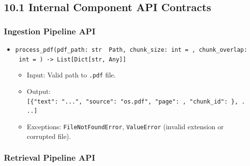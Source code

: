 \documentclass[
]{article}
\providecommand{\tightlist}{%
  \setlength{\itemsep}{0pt}\setlength{\parskip}{0pt}}
\begin{document}
\subsection{10.1 Internal Component API
Contracts}\label{internal-component-api-contracts}

\subsubsection{Ingestion Pipeline API}\label{ingestion-pipeline-api}

\begin{itemize}
\tightlist
\item
  \texttt{process\_\allowbreak pdf(\allowbreak pdf\_\allowbreak path:\ \allowbreak str\ \allowbreak \textbar{}\ \allowbreak Path,\allowbreak \ \allowbreak chunk\_\allowbreak size:\ \allowbreak int\ \allowbreak =\allowbreak \ ,\allowbreak \ \allowbreak chunk\_\allowbreak overlap:\ \allowbreak int\ \allowbreak =\allowbreak \ )\allowbreak \ \allowbreak -\textgreater{}\allowbreak \ \allowbreak List{[}Dict{[}str,\allowbreak \ \allowbreak Any{]}{]}}

  \begin{itemize}
  \tightlist
  \item
    Input: Valid path to \texttt{.\allowbreak pdf} file.
  \item
    Output:
    \texttt{{[}\{"text":\ \allowbreak ".\allowbreak .\allowbreak .",\allowbreak \ \allowbreak "source":\ \allowbreak "os.\allowbreak pdf",\allowbreak \ \allowbreak "page":\ ,\allowbreak \ \allowbreak "chunk\_\allowbreak id":\ \},\allowbreak \ \allowbreak .\allowbreak .\allowbreak .{]}}
  \item
    Exceptions: \texttt{FileNotFoundError}, \texttt{ValueError} (invalid
    extension or corrupted file).
  \end{itemize}
\end{itemize}

\subsubsection{Retrieval Pipeline API}\label{retrieval-pipeline-api}
\end{document}
